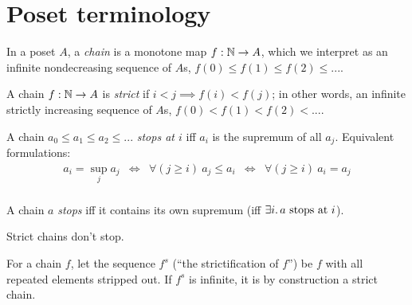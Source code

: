 \documentclass{article}
\begin{document}
\section{Poset terminology}

\begin{definition}[Chain]
  In a poset $A$, a \emph{chain} is a monotone map $f : \mathbb{N} \to A$, which we
  interpret as an infinite nondecreasing sequence of $A$s, $f(0) \le f(1) \le
  f(2) \le ...$.
\end{definition}

\begin{definition}
  A chain $f : \mathbb{N} \to A$ is \emph{strict} if $i < j \implies f(i) < f(j)$; in
  other words, an infinite strictly increasing sequence of $A$s, $f(0) < f(1) <
  f(2) < ...$.
\end{definition}

\begin{definition}[Stops at]
  A chain $a_0 \le a_1 \le a_2 \le ...$ \emph{stops at $i$} iff $a_i$ is the
  supremum of all $a_j$. Equivalent formulations:
  \[\begin{array}{ccccc}
    a_i = \sup_j a_j
    &\Leftrightarrow& \forall(j \ge i)\ a_j \le a_i
    &\Leftrightarrow& \forall(j \ge i)\ a_i = a_j\\
  \end{array}\]
\end{definition}

\begin{definition}[Stops]
  A chain $a$ \emph{stops} iff it contains its own supremum (iff $\exists
  i.\, a~\text{stops at}~i$).
\end{definition}

\begin{observation} Strict chains don't stop. \end{observation}

\begin{definition}
  For a chain $f$, let the sequence $f^s$ (``the strictification of $f$'') be
  $f$ with all repeated elements stripped out. If $f^s$ is infinite, it is by
  construction a strict chain.
\end{definition}

\end{document}
